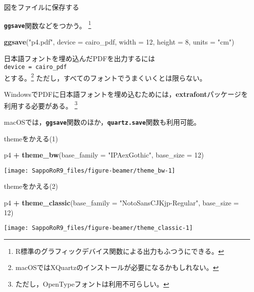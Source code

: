 \documentclass[ignorenonframetext,]{beamer}
\newenvironment{Shaded}{\begin{snugshade}}{\end{snugshade}}
\newcommand{\KeywordTok}[1]{\textcolor[rgb]{0.13,0.29,0.53}{\textbf{#1}}}
\newcommand{\DataTypeTok}[1]{\textcolor[rgb]{0.13,0.29,0.53}{#1}}
\newcommand{\DecValTok}[1]{\textcolor[rgb]{0.00,0.00,0.81}{#1}}
\newcommand{\StringTok}[1]{\textcolor[rgb]{0.31,0.60,0.02}{#1}}
\newcommand{\OperatorTok}[1]{\textcolor[rgb]{0.81,0.36,0.00}{\textbf{#1}}}
\newcommand{\NormalTok}[1]{#1}
\let\oldShaded\Shaded
\let\endoldShaded\endShaded
\renewenvironment{Shaded}{\footnotesize\oldShaded}{\endoldShaded}
\begin{document}
\begin{frame}[fragile]{図をファイルに保存する}

\textbf{\texttt{ggsave}}関数などをつかう。
\footnote{R標準のグラフィックデバイス関数による出力もふつうにできる。}

\begin{Shaded}
\begin{Highlighting}[]
\KeywordTok{ggsave}\NormalTok{(}\StringTok{"p4.pdf"}\NormalTok{, }\DataTypeTok{device =}\NormalTok{ cairo_pdf,}
       \DataTypeTok{width =} \DecValTok{12}\NormalTok{, }\DataTypeTok{height =} \DecValTok{8}\NormalTok{, }\DataTypeTok{units =} \StringTok{"cm"}\NormalTok{)}
\end{Highlighting}
\end{Shaded}

日本語フォントを埋め込んだPDFを出力するには\\
\texttt{device\ =\ cairo\_pdf}\\
とする。\footnote{macOSではXQuartzのインストールが必要になるかもしれない。}
ただし，すべてのフォントでうまくいくとは限らない。

WindowsでPDFに日本語フォントを埋め込むためには，\textbf{extrafont}パッケージを利用する必要がある。
\footnote{ただし，OpenTypeフォントは利用不可らしい。}

\vspace{12pt}

macOSでは，\textbf{\texttt{ggsave}}関数のほか，\textbf{\texttt{quartz.save}}関数も利用可能。

\end{frame}

\begin{frame}[fragile]{themeをかえる(1)}

\begin{Shaded}
\begin{Highlighting}[]
\NormalTok{p4 }\OperatorTok{+}\StringTok{ }\KeywordTok{theme_bw}\NormalTok{(}\DataTypeTok{base_family =} \StringTok{"IPAexGothic"}\NormalTok{,}
              \DataTypeTok{base_size =} \DecValTok{12}\NormalTok{)}
\end{Highlighting}
\end{Shaded}

\texttt{[image: SappoRoR9\_files/figure-beamer/theme\_bw-1]}

\end{frame}

\begin{frame}[fragile]{themeをかえる(2)}

\begin{Shaded}
\begin{Highlighting}[]
\NormalTok{p4 }\OperatorTok{+}\StringTok{ }\KeywordTok{theme_classic}\NormalTok{(}\DataTypeTok{base_family =} \StringTok{"NotoSansCJKjp-Regular"}\NormalTok{,}
                   \DataTypeTok{base_size =} \DecValTok{12}\NormalTok{)}
\end{Highlighting}
\end{Shaded}

\texttt{[image: SappoRoR9\_files/figure-beamer/theme\_classic-1]}

\end{frame}
\end{document}
